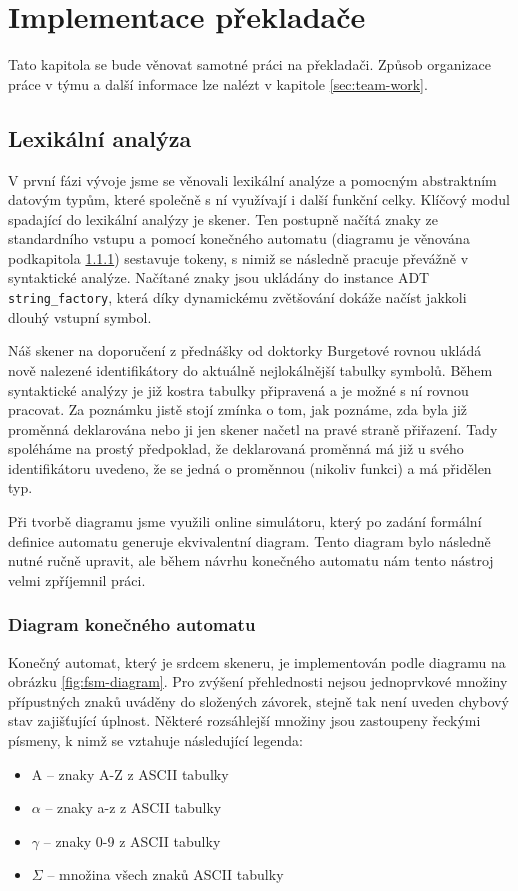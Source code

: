 \documentclass[11pt,a4paper]{article}
\newcommand\Alpha{\mathrm{A}} %
\begin{document}
\section{Implementace překladače}

Tato kapitola se bude věnovat samotné práci na překladači. Způsob organizace práce v týmu a další informace lze nalézt v kapitole \ref{sec:team-work}.

    \subsection{Lexikální analýza}
    V první fázi vývoje jsme se věnovali lexikální analýze a pomocným abstraktním datovým typům, které společně s ní využívají i další funkční celky. Klíčový modul spadající do lexikální analýzy je skener. Ten postupně načítá znaky ze standardního vstupu a pomocí konečného automatu (diagramu je věnována podkapitola \ref{sec:fsm-diagram}) sestavuje tokeny, s nimiž se následně pracuje převážně v syntaktické analýze. Načítané znaky jsou ukládány do instance ADT \texttt{string\_factory}, která díky dynamickému zvětšování dokáže načíst jakkoli dlouhý vstupní symbol.
    
    Náš skener na doporučení z přednášky od doktorky Burgetové rovnou ukládá nově nalezené identifikátory do aktuálně nejlokálnější tabulky symbolů. Během syntaktické analýzy je již kostra tabulky připravená a je možné s ní rovnou pracovat. Za poznámku jistě stojí zmínka o tom, jak poznáme, zda byla již proměnná deklarována nebo ji jen skener načetl na pravé straně přiřazení. Tady spoléháme na prostý předpoklad, že deklarovaná proměnná má již u svého identifikátoru uvedeno, že se jedná o proměnnou (nikoliv funkci) a má přidělen typ.
    
    Při tvorbě diagramu jsme využili online simulátoru\cite{fsm-simulator}, který po zadání formální definice automatu generuje ekvivalentní diagram. Tento diagram bylo následně nutné ručně upravit, ale během návrhu konečného automatu nám tento nástroj velmi zpříjemnil práci.
    
        \subsubsection{Diagram konečného automatu}
        \label{sec:fsm-diagram}
        Konečný automat, který je srdcem skeneru, je implementován podle diagramu na obrázku \ref{fig:fsm-diagram}. Pro zvýšení přehlednosti nejsou jednoprvkové množiny přípustných znaků uváděny do složených závorek, stejně tak není uveden chybový stav zajišťující úplnost. Některé rozsáhlejší množiny jsou zastoupeny řeckými písmeny, k nimž se vztahuje následující legenda:
        \begin{itemize}
            \item $\Alpha$ -- znaky A-Z z ASCII tabulky
            \item $\alpha$ -- znaky a-z z ASCII tabulky
            \item $\gamma$ -- znaky 0-9 z ASCII tabulky
            \item $\Sigma$ -- množina všech znaků ASCII tabulky
        \end{itemize}
    
\end{document}
